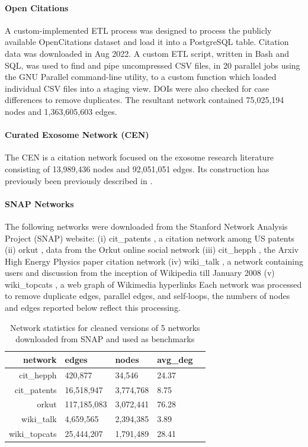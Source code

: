 \documentclass[a4paper]{article}   	%
\begin{document}
\paragraph{Open Citations}
A custom-implemented ETL process was designed to process the publicly available OpenCitations dataset \citep{Peroni2020} and load it into a PostgreSQL table. Citation data was downloaded in Aug 2022. A custom ETL script, written in Bash and SQL, was used to find and pipe uncompressed CSV files, in 20 parallel jobs using the GNU Parallel command-line utility, to a custom function which loaded individual CSV files into a staging view. DOIs were also checked for case differences to remove duplicates.  The resultant network contained 75,025,194 nodes and 1,363,605,603 edges.  


\paragraph{Curated Exosome Network (CEN)}
The CEN is a citation network focused on the exosome research literature consisting of 13,989,436 nodes and 92,051,051 edges. Its construction has previously been previously described in \cite{Jakatdar_2022}.


\paragraph{SNAP Networks}The following networks were downloaded from the Stanford Network Analysis Project (SNAP) website: (i) cit\_patents \citep{Leskovec2005}, a citation network among US patents (ii) orkut \citep{Yang2013}, data from the Orkut online social network (iii) cit\_hepph \citep{Leskovec2005}, the Arxiv High Energy Physics paper citation network  (iv) wiki\_talk \citep{Leskovec2010}, a network containing users and discussion from the inception of Wikipedia till January 2008 (v) wiki\_topcats \citep{Yin2017}, a web graph of Wikimedia hyperlinks Each network was processed to remove duplicate edges, parallel edges, and self-loops, the numbers of nodes and edges reported below reflect this processing.

\begin{table}[ht]
\centering
\begin{tabular}{rlllr}
  \hline
 network & edges & nodes & avg\_deg \\
  \hline
  cit\_hepph & 420,877 & 34,546 & 24.37 \\
  cit\_patents & 16,518,947 & 3,774,768 & 8.75 \\
  orkut & 117,185,083 & 3,072,441 & 76.28 \\
  wiki\_talk & 4,659,565 & 2,394,385 & 3.89 \\
  wiki\_topcats & 25,444,207 & 1,791,489 & 28.41 \\
   \hline
\end{tabular}
\caption{Network statistics for cleaned versions of 5 networks downloaded from SNAP and used as benchmarks}
\end{table}
\end{document}
